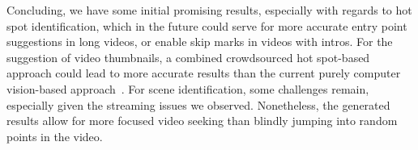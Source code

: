 \documentclass[10pt,twocolumn,letterpaper]{article}
\begin{document}
Concluding, we have some initial promising results, especially with regards to hot spot identification, which in the future could serve for more accurate entry point suggestions in long videos, or enable skip marks in videos with intros. For the suggestion of video thumbnails, a combined crowdsourced hot spot-based approach could lead to more accurate results than the current purely computer vision-based approach~\cite{googleresearch}. For scene identification, some challenges remain, especially given the streaming issues we observed. Nonetheless, the generated results allow for more focused video seeking than blindly jumping into random points in the video.

{\small


}
\end{document}
